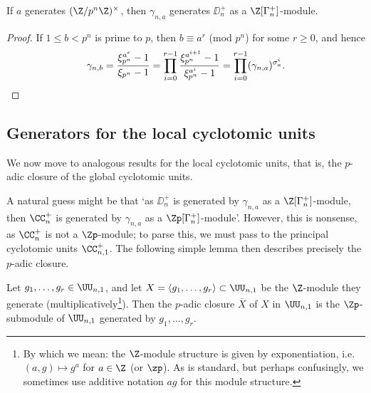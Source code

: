 \documentclass[a4paper,10pt, english, reqno]{smfart}
\newcommand{\GG}{\Gamma}
\numberwithin{equation}{section}
\begin{document}
\begin{corollary} \label{cor:cyc units gen 2}
If $a$ generates $(\Z / p^n \Z)^\times$, then $\gamma_{n,a}$ generates $\DD^+_{n}$ as a $\Z[\GG_n^+]$-module. 
\end{corollary}

\begin{proof}
	If $1 \leq b < p^n$ is prime to $p$, then $b \equiv a^r$ (mod $p^n$) for some $r \geq 0$, and hence
	 \[ \gamma_{n,b} = \frac{\xi_{p^n}^{a^r}-1}{\xi_{p^n}-1} = \prod_{i=0}^{r-1}\frac{\xi_{p^n}^{a^{i+1}}-1}{\xi_{p^n}^{a^i}-1} =  \prod_{i = 0}^{r - 1} (\gamma_{n,a})^{\sigma_a^i}. \qedhere
	 \]
\end{proof}


\subsection{Generators for the local cyclotomic units}

We now move to analogous results for the local cyclotomic units, that is, the $p$-adic closure of the global cyclotomic units.  


A natural guess might be that `as $\DD_n^+$ is generated by $\gamma_{n,a}$ as a $\Z[\Gamma_n^+]$-module, then $\CC_n^+$ is generated by $\gamma_{n,a}$ as a $\Zp[\Gamma_n^+]$-module'. However, this is nonsense, as $\CC_n^+$ is not a $\Zp$-module; to parse this, we must pass to the principal cyclotomic units $\CC_{n,1}^+$. The following simple lemma then describes precisely the $p$-adic closure.


\begin{lemma}\label{lem:closure}
Let $g_1,\dots,g_r \in \UU_{n,1}$, and let $X = \langle g_1,\dots,g_r\rangle \subset \UU_{n,1}$ be the $\Z$-module they generate (multiplicatively\footnote{By which we mean: the $\Z$-module structure is given by exponentiation, i.e.\ $(a,g) \mapsto g^a$ for $a \in \Z$ (or $\zp$). As is standard, but perhaps confusingly, we sometimes use additive notation $ag$ for this module structure.}). Then the $p$-adic closure $\overline{X}$ of $X$ in $\UU_{n,1}$ is the $\Zp$-submodule of $\UU_{n,1}$ generated by $g_1,\dots,g_r$.
\end{lemma}
\end{document}
